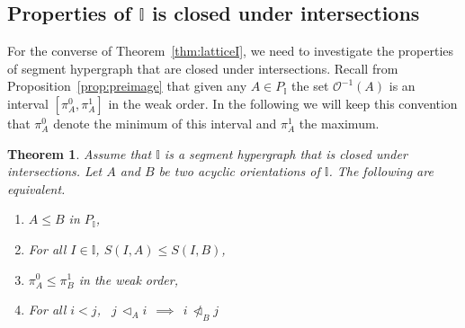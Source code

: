 \documentclass[reqno]{amsart}
\newtheorem{theorem}{Theorem}[section]
\theoremstyle{definition}
\newcommand{\less}{\vartriangleleft} %
\newcommand{\Or}{\mathcal O}  %
\newcommand{\II}{\mathbb I} %
\begin{document}
\subsection{Properties of $\II$ is closed under intersections}  
\label{subsec:IntClosedI}

For the converse of Theorem~\ref{thm:latticeI}, we need to investigate the properties of segment hypergraph that are closed under intersections.
Recall from Proposition~\ref{prop:preimage} that given any $A\in P_\II$ the set $\Or^{-1}(A)$ is an interval $[\pi^0_A,\pi^1_A]$ in the weak order.
In the following we will keep this convention that $\pi^0_A$ denote the minimum of this interval and $\pi^1_A$ the maximum.

\begin{theorem}\label{thm:propertieofintI}
Assume that $\II$ is a segment hypergraph that is closed under intersections. Let $A$ and $B$ be two acyclic orientations of $\II$.
The following are equivalent.
\begin{enumerate}
	\item[{\rm (a)}] $A\le B$ in $P_\II$,
	\item[{\rm (b)}]  For all $I\in\II$, $S(I,A)\le S(I,B)$,
	\item[{\rm (c)}]  $\pi^0_A \le \pi^1_B$ in the weak order,
	\item[{\rm (d)}]  For all $i<j$, \ $j\,\less_Ai \ \ \implies\ \  i \,\not\less_B j$
\end{enumerate}
\end{theorem}
\end{document}

